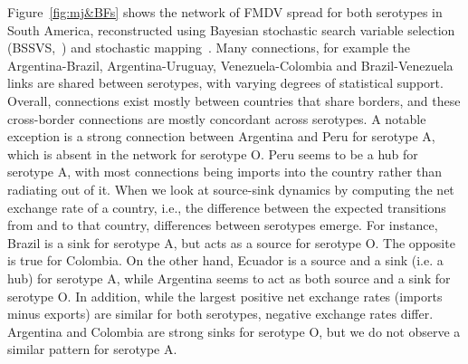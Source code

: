 \documentclass[10pt]{article}
\begin{document}
Figure~\ref{fig:mj&BFs} shows the network of FMDV spread for both serotypes in South America, reconstructed using Bayesian stochastic search variable selection (BSSVS,~\cite{Lemey2009}) and stochastic mapping~\citep{Minin2008b}. %
Many connections, for example the Argentina-Brazil, Argentina-Uruguay, Venezuela-Colombia and Brazil-Venezuela links are shared between serotypes, with varying degrees of statistical support.
Overall, connections exist mostly between countries that share borders, and these cross-border connections are mostly concordant across serotypes.
A notable exception is a strong connection between Argentina and Peru for serotype A, which is absent in the network for serotype O.
Peru seems to be a hub for serotype A, with most connections being imports into the country rather than radiating out of it.
When we look at source-sink dynamics by computing the net exchange rate of a country, i.e., the difference between the expected transitions from and to that country, differences between serotypes emerge.
For instance,  Brazil is a sink for serotype A, but acts as a source for serotype O.
The opposite is true for Colombia.
On the other hand, Ecuador is a source and a sink (i.e. a hub) for serotype A, while  Argentina seems to act as both source and a sink for serotype O.
In addition, while the largest positive net exchange rates (imports minus exports) are similar for both serotypes, negative exchange rates differ. %
Argentina and Colombia are strong sinks for serotype O, but we do not observe a similar pattern for serotype A. 
\end{document}
